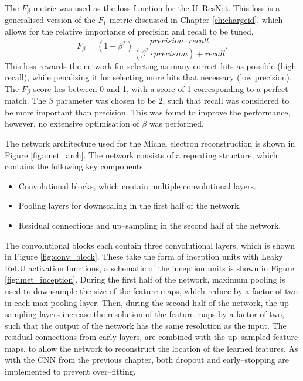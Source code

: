 The $F_\beta$ metric\cite{VanRijsbergenC.J.1975Ir} was used as the loss 
function for the U--ResNet.  This loss is a generalised version of the $F_1$ 
metric discussed in Chapter \ref{ch:chargeid}, which allows for the relative 
importance of precision and recall to be tuned,
\begin{equation*}
	F_\beta = \left( 1 + \beta^2\right) \frac{precision \cdot
	recall}{\left(\beta^2 \cdot precision\right) + recall}.
\end{equation*}
This loss rewards the network for selecting as many correct hits as possible
(high recall), while penalising it for selecting more hits that necessary (low
precision). The $F_\beta$ score lies between 0 and 1, with a score of 1
corresponding to a perfect match. The $\beta$ parameter was chosen to be 2, 
such that recall was considered to be more important than precision. This was 
found to improve the performance, however, no extensive optimisation of $\beta$ 
was performed.

The network architecture used for the Michel electron reconstruction is shown in
Figure \ref{fig:unet_arch}. The network consists of a repeating structure, which
contains the following key components:
\begin{itemize}
	\item Convolutional blocks, which contain multiple convolutional layers.
	\item Pooling layers for downscaling in the first half of the network.
	\item Residual connections and up--sampling in the second half of the network.
\end{itemize}
The convolutional blocks each contain three convolutional layers, which is 
shown in Figure \ref{fig:conv_block}. These take the form of inception 
units\cite{Szegedy2015} with Leaky ReLU activation functions, a schematic of 
the inception units is shown in Figure \ref{fig:unet_inception}. During the 
first half of the network, maximum pooling is used to downsample the size of 
the feature maps, which reduce by a factor of two in each max pooling layer. 
Then, during the second half of the network, the up--sampling layers increase 
the resolution of the feature maps by a factor of two, such that the output of 
the network has the same resolution as the input.  The residual connections 
from early layers, are combined with the up--sampled feature maps, to allow 
the network to reconstruct the location of the learned features. As with the 
CNN from the previous chapter, both dropout and early--stopping are 
implemented to prevent over--fitting.

